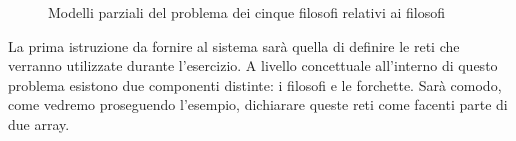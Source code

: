 \documentclass[italian,12pt]{book}
\begin{document}
\begin{figure}[htbp] 
\centering%
\hspace{1cm}\vspace{1cm}%
\hspace{1cm}\vspace{1cm}%
\hspace{2cm}%
\caption{Modelli parziali del problema dei cinque filosofi relativi ai filosofi\label{fig:modelli_parziali}} 
\end{figure} 

La prima istruzione da fornire al sistema sarà quella di definire le reti
che verranno utilizzate durante l'esercizio. A livello concettuale all'interno di questo problema 
esistono due componenti distinte: i filosofi e le forchette. Sarà comodo, come vedremo proseguendo
l'esempio, dichiarare queste reti come facenti parte di due array.
\end{document}
